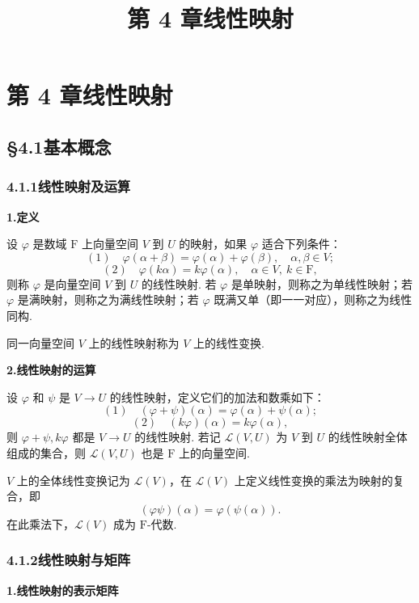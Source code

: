 \documentclass[UTF8,12pt,a4paper,fontset=fandol]{ctexart}
\title{第 4 章\quad 线性映射}
\author{}
\date{}
\begin{document}
\maketitle

\section*{第 4 章\quad 线性映射}

\subsection*{§4.1\quad 基本概念}

\subsubsection*{4.1.1\quad 线性映射及运算}

\noindent\textbf{1.\quad 定义}

设 $\varphi$ 是数域 $\mathrm{F}$ 上向量空间 $V$ 到 $U$ 的映射，如果 $\varphi$ 适合下列条件：
\[
(1)\quad \varphi(\alpha+\beta)=\varphi(\alpha)+\varphi(\beta),\quad \alpha,\beta\in V;
\]
\[
(2)\quad \varphi(k\alpha)=k\varphi(\alpha),\quad \alpha\in V,\ k\in \mathrm{F},
\]
则称 $\varphi$ 是向量空间 $V$ 到 $U$ 的线性映射. 若 $\varphi$ 是单映射，则称之为单线性映射；若 $\varphi$ 是满映射，则称之为满线性映射；若 $\varphi$ 既满又单（即一一对应），则称之为线性同构.

同一向量空间 $V$ 上的线性映射称为 $V$ 上的线性变换.

\noindent\textbf{2.\quad 线性映射的运算}

设 $\varphi$ 和 $\psi$ 是 $V\to U$ 的线性映射，定义它们的加法和数乘如下：
\[
(1)\quad (\varphi+\psi)(\alpha)=\varphi(\alpha)+\psi(\alpha);
\]
\[
(2)\quad (k\varphi)(\alpha)=k\varphi(\alpha),
\]
则 $\varphi+\psi,k\varphi$ 都是 $V\to U$ 的线性映射. 若记 $\mathcal{L}(V,U)$ 为 $V$ 到 $U$ 的线性映射全体组成的集合，则 $\mathcal{L}(V,U)$ 也是 $\mathrm{F}$ 上的向量空间.

$V$ 上的全体线性变换记为 $\mathcal{L}(V)$，在 $\mathcal{L}(V)$ 上定义线性变换的乘法为映射的复合，即
\[
(\varphi\psi)(\alpha)=\varphi(\psi(\alpha)).
\]
在此乘法下，$\mathcal{L}(V)$ 成为 $\mathrm{F}$-代数.

\subsubsection*{4.1.2\quad 线性映射与矩阵}

\noindent\textbf{1.\quad 线性映射的表示矩阵}
\end{document}
